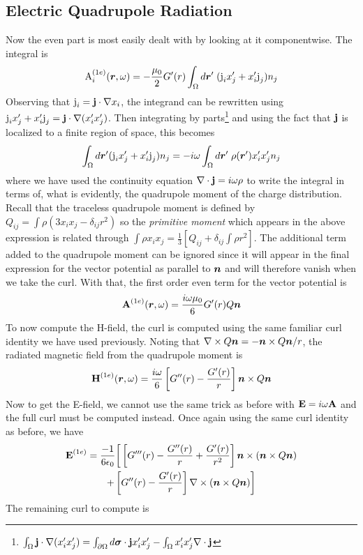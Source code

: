 \documentclass[twocolumn]{gwclass}
\newcommand{\bt}[1]{\text{\textbf{#1}}}
\begin{document}
	\subsection{Electric Quadrupole Radiation}
	Now the even part is most easily dealt with by looking at it componentwise. The integral is
	$$ \text{\normalfont{A}}_i^{(1e)}(\boldsymbol{r},\omega) = -\frac{\mu_0}{2}G'(r)\int_\Omega d\boldsymbol{r}'\;(\text{\normalfont{j}}_i x_j' + x_i'\text{\normalfont{j}}_j)n_j $$
	Observing that $\t{j}_i = \bt{j}\cdot\nabla x_i$, the integrand can be rewritten using $\t{j}_i x_j' + x_i'\t{j}_j = \bt{j}\cdot\nabla(x_i'x_j')$. Then integrating by parts\footnote{$\int_\Omega \bt{j}\cdot\nabla(x_i'x_j') = \int_{\partial\Omega} d\*\sigma\cdot\bt{j}x_i'x_j' - \int_\Omega x_i'x_j' \nabla\cdot\bt{j}$} and using the fact that $\bt{j}$ is localized to a finite region of space, this becomes 
	$$ \int_\Omega d\boldsymbol{r}'(\text{\normalfont{j}}_i x_j' + x_i'\text{\normalfont{j}}_j)n_j = -i\omega\int_\Omega d\boldsymbol{r}'\;\rho(\boldsymbol{r}')x_i'x_j' n_j $$
	where we have used the continuity equation $\nabla\cdot\bt{j}=i\omega\rho$ to write the integral in terms of, what is evidently, the quadrupole moment of the charge distribution. Recall that the traceless quadrupole moment is defined by $Q_{ij} = \int \rho(3 x_ix_j - \delta_{ij}r^2)$ so the \emph{primitive moment} which appears in the above expression is related through $\int \rho x_ix_j = \frac{1}{3}[Q_{ij} + \delta_{ij}\int \rho r^2 ]$. The additional term added to the quadrupole moment can be ignored since it will appear in the final expression for the vector potential as parallel to $\boldsymbol{n}$ and will therefore vanish when we take the curl. With that, the first order even term for the vector potential is
	$$ \bt{A}^{(1e)}(\*r,\omega) = \frac{i\omega\mu_0}{6} G'(r) Q\*n $$
	To now compute the H-field, the curl is computed using the same familiar curl identity we have used previously. Noting that $\nabla\times Q\boldsymbol{n} =-\boldsymbol{n}\times Q\boldsymbol{n}/r$, the radiated magnetic field from the quadrupole moment is
$$ \bt{H}^{(1e)}(\*r,\omega) = \frac{i\omega}{6}\left[G''(r) - \frac{G'(r)}{r}\right]\*n\times Q\*n$$
	Now to get the E-field, we cannot use the same trick as before with $\bt{E}=i\omega\bt{A}$ and the full curl must be computed instead. Once again using the same curl identity as before, we have
	\begin{multline*} 
		\bt{E}^{(1e)} = \frac{-1}{6\epsilon_0}\bigg[\left[G'''(r) - \frac{G''(r)}{r} + \frac{G'(r)}{r^2}\right]\*n\times(\*n\times Q\*n) \\
		+ \left[G''(r) - \frac{G'(r)}{r}\right] \nabla\times(\*n\times Q\*n)\bigg]
	\end{multline*}
	The remaining curl to compute is
\end{document}
